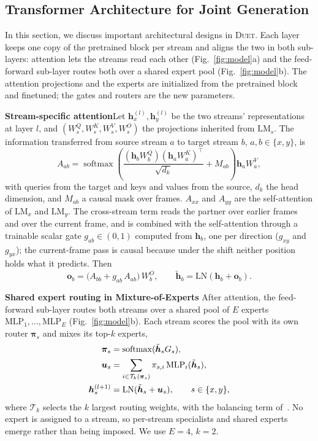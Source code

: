 \documentclass{article}
\newcommand{\sys}{\textsc{Duet}\xspace}
\begin{document}
\subsection{Transformer Architecture for Joint Generation}
\label{sec:Duet}

In this section, we discuss important architectural designs in \sys.
Each layer keeps one copy of the pretrained block per stream and aligns
the two in both sub-layers: attention lets the streams read each other
(Fig.~\ref{fig:model}a) and the feed-forward sub-layer routes both over
a shared expert pool (Fig.~\ref{fig:model}b). The attention projections
and the experts are initialized from the pretrained block and
finetuned; the gates and routers are the new parameters.

\textbf{Stream-specific attention}\quad Let $\bm{h}^{(l)}_x, \bm{h}^{(l)}_y$ be
the two streams' representations at layer $l$, and $(W^Q_s, W^K_s,
W^V_s, W^O_s)$ the projections inherited from $\mathrm{LM}_s$. The
information transferred from source stream $a$ to target stream $b$,
$a,b\in\{x,y\}$, is
\begin{equation}
    A_{ab}
    =
    \operatorname{softmax}
    \left(
        \frac{(\bm{h}_b W^Q_b)(\bm{h}_a W^K_a)^\top}{\sqrt{d_k}}
        + M_{ab}
    \right)
    \bm{h}_a W^V_a,
    \label{eq:Duet_attn}
\end{equation}
with queries from the target and keys and values from the source, $d_k$
the head dimension, and $M_{ab}$ a causal mask over frames. $A_{xx}$
and $A_{yy}$ are the self-attention of $\mathrm{LM}_x$ and
$\mathrm{LM}_y$. The cross-stream term reads the partner over earlier
frames and over the current frame, and is combined with the
self-attention through a trainable scalar gate $g_{ab}\in(0,1)$
computed from $\bm{h}_b$, one per direction ($g_{xy}$ and $g_{yx}$);
the current-frame pass is causal because under the shift neither
position holds what it predicts. Then
\begin{equation}
    \bm{o}_b = \bigl(A_{bb} + g_{ab}\,A_{ab}\bigr)\,W^O_b,
    \qquad
    \tilde{\bm{h}}_b = \mathrm{LN}(\bm{h}_b + \bm{o}_b).
    \label{eq:gates}
\end{equation}

\textbf{Shared expert routing in Mixture-of-Experts}\quad
After attention, the feed-forward sub-layer routes both streams
over a shared pool of $E$ experts
$\mathrm{MLP}_1,\ldots,\mathrm{MLP}_E$
(Fig.~\ref{fig:model}b). Each stream scores the pool with its own
router $\boldsymbol{\pi}_s$ and mixes its top-$k$ experts,
\begin{align}
    \boldsymbol{\pi}_s
    &= \operatorname{softmax}(\tilde{\bm{h}}_s G_s),
    \notag \\
    \bm{u}_s
    &= \sum_{i\in\mathcal{T}_k(\boldsymbol{\pi}_s)}
       \pi_{s,i}\,\mathrm{MLP}_i(\tilde{\bm{h}}_s),
    \notag \\
    \bm{h}^{(l+1)}_s
    &= \mathrm{LN}(\tilde{\bm{h}}_s + \bm{u}_s),
    \qquad s\in\{x,y\},
    \label{eq:moe}
\end{align}
where $\mathcal{T}_k$ selects the $k$ largest routing weights, with
the balancing term of~\cite{fedus2022switch}. No expert is assigned
to a stream, so per-stream specialists and shared experts emerge
rather than being imposed. We use $E=4$, $k=2$.
\end{document}

